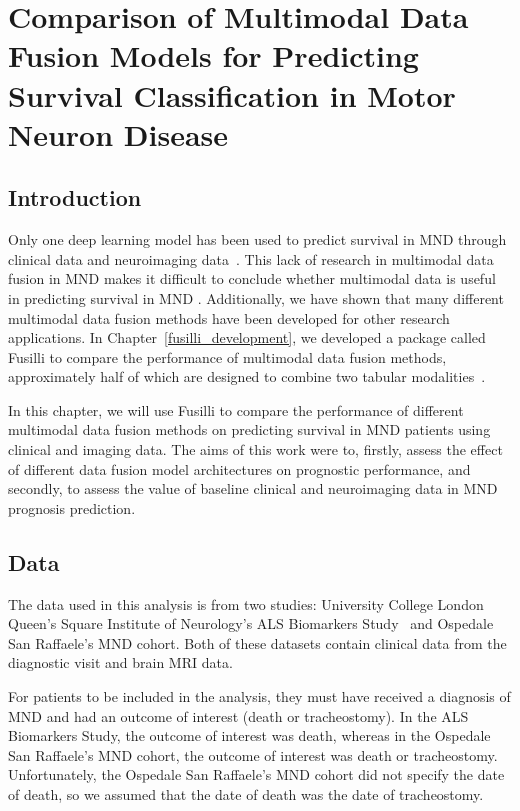 \chapter{Comparison of Multimodal Data Fusion Models for Predicting Survival Classification in Motor Neuron Disease}
\label{fusilli_on_mnd}

\section{Introduction}
Only one deep learning model has been used to predict survival in MND through clinical data and neuroimaging data~\cite{vanderburghDeepLearningPredictions2017}.
This lack of research in multimodal data fusion in MND makes it difficult to conclude whether multimodal data is useful in predicting survival in MND .
Additionally, we have shown that many different multimodal data fusion methods have been developed for other research applications.
In Chapter~\ref{fusilli_development}, we developed a package called Fusilli to compare the performance of multimodal data fusion methods, approximately half of which are designed to combine two tabular modalities~\cite{townendFlorencejtFusilliFusilli2024}.

In this chapter, we will use Fusilli to compare the performance of different multimodal data fusion methods on predicting survival in MND patients using clinical and imaging data.
The aims of this work were to, firstly, assess the effect of different data fusion model architectures on prognostic performance, and secondly, to assess the value of baseline clinical and neuroimaging data in MND prognosis prediction.

\section{Data}

The data used in this analysis is from two studies: University College London Queen's Square Institute of Neurology's ALS Biomarkers Study~\cite{UKMNDCSG} and Ospedale San Raffaele's MND cohort.
Both of these datasets contain clinical data from the diagnostic visit and brain MRI data.

For patients to be included in the analysis, they must have received a diagnosis of MND and had an outcome of interest (death or tracheostomy).
In the ALS Biomarkers Study, the outcome of interest was death, whereas in the Ospedale San Raffaele's MND cohort, the outcome of interest was death or tracheostomy.
Unfortunately, the Ospedale San Raffaele's MND cohort did not specify the date of death, so we assumed that the date of death was the date of tracheostomy.

